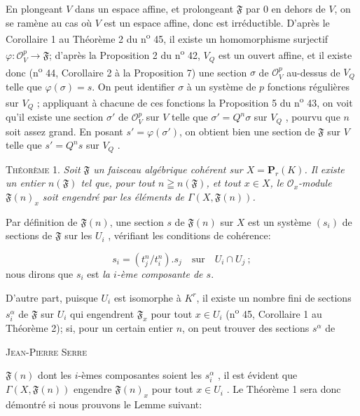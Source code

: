 En plongeant $V$ dans un espace affine, et prolongeant $\mathfrak{F}$ par 0 en dehors de $V$, on se ramène au cas où $V$ est un espace affine, donc est irréductible. D'après le Corollaire 1 au Théorème 2 du n\textsuperscript{o} 45, il existe un homomorphisme surjectif $\varphi: \mathcal{O}_V^p \longrightarrow \mathfrak{F}$; d'après la Proposition 2 du n\textsuperscript{o} 42, $V_Q$ est un ouvert affine, et il existe donc (n\textsuperscript{o} 44, Corollaire 2 à la Proposition 7) une section $\sigma$ de $\mathcal{O}_V^p$ au-dessus de $V_Q$ telle que $\varphi(\sigma) = s$. On peut identifier $\sigma$ à un système de $p$ fonctions régulières sur $V_Q$ ; appliquant à chacune de ces fonctions la Proposition 5 du n\textsuperscript{o} 43, on voit qu'il existe une section $\sigma'$ de $\mathcal{O}_V^p$ sur $V$ telle que $\sigma' = Q^n \sigma$ sur $V_Q$ , pourvu que $n$ soit assez grand. En posant $s' = \varphi(\sigma')$, on obtient bien une section de $\mathfrak{F}$ sur $V$ telle que $s' = Q^n s$ sur $V_Q$ .

\textsc{Théorème} 1. \textit{Soit $\mathfrak{F}$ un faisceau algébrique cohérent sur $X = \mathbf{P}_r(K)$. Il existe un entier $n(\mathfrak{F})$ tel que, pour tout $n \geqq n(\mathfrak{F})$, et tout $x \in X$, le $\mathcal{O}_x$-module $\mathfrak{F}(n)_x$ soit engendré par les éléments de $\Gamma(X, \mathfrak{F}(n))$.}

Par définition de $\mathfrak{F}(n)$, une section $s$ de $\mathfrak{F}(n)$ sur $X$ est un système $(s_i)$ de sections de $\mathfrak{F}$ sur les $U_i$ , vérifiant les conditions de cohérence:

\begin{equation*}
s_i = (t_j^n/t_i^n).s_j \quad \mathrm{sur} \quad U_i \cap U_j \ ;
\end{equation*}
nous dirons que $s_i$ est \textit{la $i$-ème composante de $s$}.

D'autre part, puisque $U_i$ est isomorphe à $K^r$, il existe un nombre fini de sections $s_i^\alpha$ de $\mathfrak{F}$ sur $U_i$ qui engendrent $\mathfrak{F}_x$ pour tout $x \in U_i$ (n\textsuperscript{o} 45, Corollaire 1 au Théorème 2); si, pour un certain entier $n$, on peut trouver des sections $s^\alpha$ de 




\textsc{Jean-Pierre Serre}

 $\mathfrak{F}(n)$ dont les $i$-èmes composantes soient les $s_i^\alpha$ , il est évident que $\Gamma(X, \mathfrak{F}(n))$ engendre $\mathfrak{F}(n)_x$ pour tout $x \in U_i$ . Le Théorème 1 sera donc démontré si nous prouvons le Lemme suivant:

